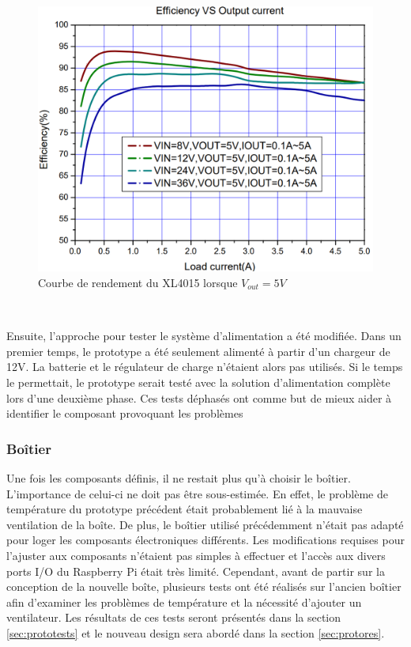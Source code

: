 \begin{figure}[ht!]
  \centering
  \includegraphics[scale=0.4]{img/el_prototype/rendement.png}
  \caption{Courbe de rendement du XL4015 lorsque $V_{out} = 5V$ \cite{xl4015_datasheet}}
  \label{fig:xlrend}
\end{figure}
~

\noindent
Ensuite, l'approche pour tester le système d'alimentation a été modifiée. Dans un premier temps, le prototype a été seulement alimenté à partir d'un chargeur de 12V. La batterie et le régulateur de charge n'étaient alors pas utilisés. Si le temps le permettait, le prototype serait testé avec la solution d'alimentation complète lors d'une deuxième phase. Ces tests déphasés ont comme but de mieux aider à identifier le composant provoquant les problèmes


\subsubsection{Boîtier}

\noindent
Une fois les composants définis, il ne restait plus qu'à choisir le boîtier. L'importance de celui-ci ne doit pas être sous-estimée. En effet, le problème de température du prototype précédent était probablement lié à la mauvaise ventilation de la boîte. De plus, le boîtier utilisé précédemment n'était pas adapté pour loger les composants électroniques différents. Les modifications requises pour l'ajuster aux composants n'étaient pas simples à effectuer et l'accès aux divers ports I/O du Raspberry Pi était très limité. Cependant, avant de partir sur la conception de la nouvelle boîte, plusieurs tests ont été réalisés sur l'ancien boîtier afin d'examiner les problèmes de température et la nécessité d'ajouter un ventilateur. Les résultats de ces tests seront présentés dans la section \ref{sec:prototests} et le nouveau design sera abordé dans la section \ref{sec:protores}.

